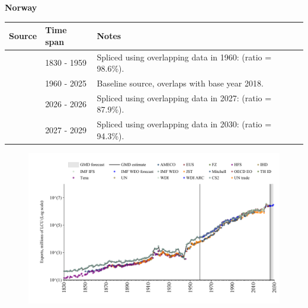 \documentclass[12pt,a4paper,landscape]{article}
\begin{document}
\begin{adjustbox}{max totalsize={\paperwidth}{\paperheight},center}
\begin{minipage}[t][\textheight][t]{\textwidth}
\vspace*{0.5cm}
{}
\begin{center}
{\Large\bfseries Norway}
\end{center}
\vspace{0.5cm}
\begin{table}[H]
\centering
\small
\begin{tabular}{|l|l|l|}
\hline
\textbf{Source} & \textbf{Time span} & \textbf{Notes} \\
\hline
\rowcolor{white}\cite{CS2_NOR}& 1830 - 1959 &Spliced using overlapping data in 1960: (ratio = 98.6\%).\\
\rowcolor{lightgray}\cite{OECD_EO}& 1960 - 2025 &Baseline source, overlaps with base year 2018.\\
\rowcolor{white}\cite{AMECO}& 2026 - 2026 &Spliced using overlapping data in 2027: (ratio = 87.9\%).\\
\rowcolor{lightgray}\cite{IMF_WEO_forecast}& 2027 - 2029 &Spliced using overlapping data in 2030: (ratio = 94.3\%).\\
\hline
\end{tabular}
\end{table}
\begin{figure}[H]
\centering
\includegraphics[width=\textwidth,height=0.6\textheight,keepaspectratio]{graphs/NOR_exports.pdf}
\end{figure}
\end{minipage}
\end{adjustbox}
\end{document}
